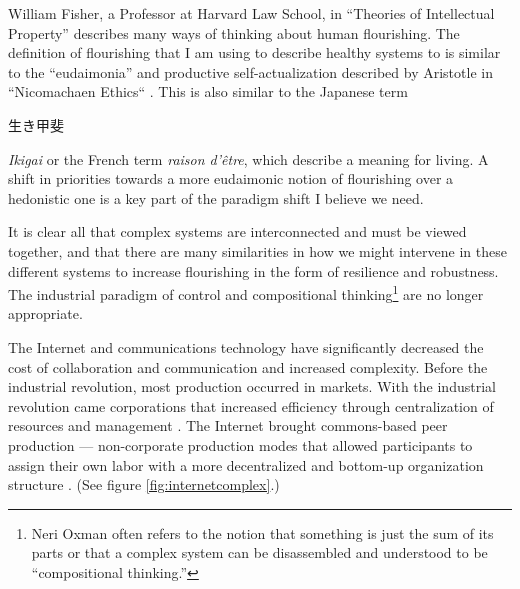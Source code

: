 William Fisher, a Professor at Harvard Law School, in ``Theories of Intellectual Property'' \cite{fisher2001theories} describes many ways of thinking about human flourishing. The definition of flourishing that I am using to describe healthy systems to is similar to the ``eudaimonia'' and productive self-actualization described by Aristotle in ``Nicomachaen Ethics`` \cite{rowe2002nicomachean}. This is also similar to the Japanese term \begin{CJK}{UTF8}{min}生き甲斐\end{CJK} \textit{Ikigai} or the French term \textit{raison d'être}, which describe a meaning for living. A shift in priorities towards a more eudaimonic notion of flourishing over a hedonistic one is a key part of the paradigm shift I believe we need.

It is clear all that complex systems are interconnected and must be viewed together, and that there are many similarities in how we might intervene in these different systems to increase flourishing in the form of resilience and robustness. The industrial paradigm of control and compositional thinking\footnote{Neri Oxman often refers to the notion that something is just the sum of its parts or that a complex system can be disassembled and understood to be ``compositional thinking.''} are no longer appropriate.
 
The Internet and communications technology have significantly decreased the cost of collaboration and communication and increased complexity. Before the industrial revolution, most production occurred in markets. With the industrial revolution came corporations that increased efficiency through centralization of resources and management \cite{coase_nature_1937}. The Internet brought commons-based peer production --- non-corporate production modes that allowed participants to assign their own labor with a more decentralized and bottom-up organization structure \cite{benkler_coases_2002}. (See figure \autoref{fig:internetcomplex}.)

